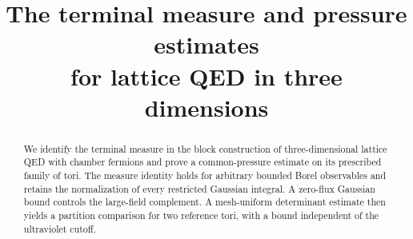 \theoremstyle{remark}
\newtheorem{remark}[ms@proposition]{Remark}
\newtheorem*{remark*}{Remark}


  \RequirePackage[backend=biber,style=alphabetic,backref=true,
    giveninits=true,isbn=false,date=year]{biblatex}
  
  \setcounter{biburlnumpenalty}{100}
  \setcounter{biburllcpenalty}{100}
  \setcounter{biburlucpenalty}{100}
  \renewcommand*{\bibfont}{\footnotesize}
\makeatother
\usepackage{mathrsfs}
\newcommand{\R}{\mathbb R}
\newcommand{\C}{\mathbb C}
\newcommand{\Z}{\mathbb Z}
\newcommand{\N}{\mathbb N}
\newcommand{\dd}{\mathrm d}
\DeclareMathOperator{\supp}{supp}
\DeclareMathOperator{\tr}{tr}
\DeclareMathOperator{\diag}{diag}
\allowdisplaybreaks
{}
\title[Terminal measure and pressure for lattice QED]{The terminal measure and pressure estimates\\
for lattice QED in three dimensions}
\date{}

\begin{abstract}
We identify the terminal measure in the block construction of
three-dimensional lattice QED with chamber fermions and prove
a common-pressure estimate on its prescribed family of tori.
The measure identity holds for arbitrary bounded Borel
observables and retains the normalization of every restricted
Gaussian integral. A zero-flux Gaussian bound controls the
large-field complement. A mesh-uniform determinant estimate
then yields a partition comparison for two reference tori,
with a bound independent of the ultraviolet cutoff.
\end{abstract}
\maketitle
\tableofcontents

